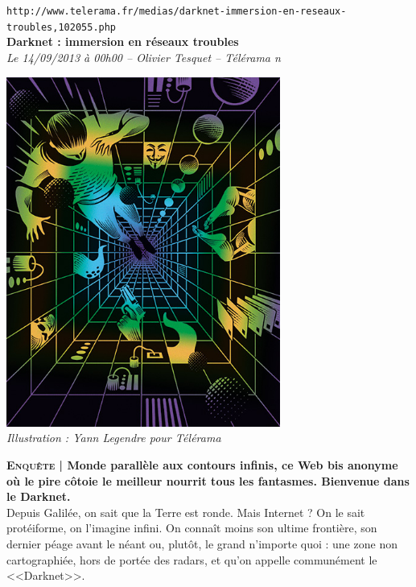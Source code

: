 \documentclass[11pt,twoside,a4paper]{article}
\begin{document}
\clearpage

\texttt{http://www.telerama.fr/medias/darknet-immersion-en-reseaux-troubles,102055.php}~\\

\textbf{Darknet : immersion en r{\'e}seaux troubles}~\\

\emph{\small Le 14/09/2013 {\`a} 00h00 -- Olivier Tesquet -- T{\'e}l{\'e}rama n }~\\

\begin{minipage}[ht]{9.25cm}
	\includegraphics[width=9.00cm]{img/darknet-immersion-en-reseaux-troubles,M124676.jpg}~\\
	\emph{Illustration : Yann Legendre pour T{\'e}l{\'e}rama }~\\
\end{minipage} \hfill \begin{minipage}[ht]{10.00cm}
	\textbf{\textsc{Enqu{\^e}te} | Monde parall{\`e}le aux contours infinis, ce Web bis anonyme o{\`u} le pire c{\^o}toie le meilleur nourrit tous les fantasmes. Bienvenue dans le Darknet. }~\\

	Depuis Galil{\'e}e, on sait que la Terre est ronde. Mais Internet ? On le sait prot{\'e}iforme, on l'imagine infini. On conna{\^i}t moins son ultime fronti{\`e}re, son dernier p{\'e}age avant le n{\'e}ant ou, plut{\^o}t, le grand n'importe quoi : une zone non cartographi{\'e}e, hors de port{\'e}e des radars, et qu'on appelle commun{\'e}ment le <<Darknet>>. ~\\


\end{minipage}
\end{document}
